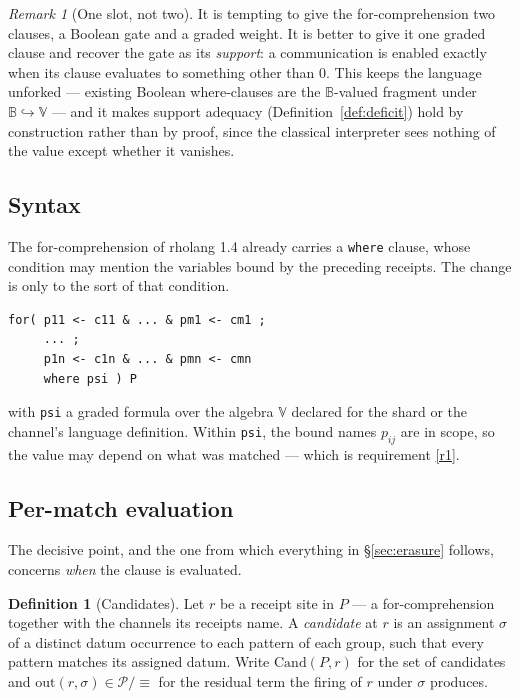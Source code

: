 \documentclass[11pt,a4paper]{article}
\theoremstyle{plain}
\theoremstyle{definition}
\newtheorem{definition}[theorem]{Definition}
\theoremstyle{remark}
\newtheorem{remark}[theorem]{Remark}
\newcommand{\V}{\mathbb{V}}
\newcommand{\Bool}{\mathbb{B}}
\newcommand{\Proc}{\mathcal{P}}
\newcommand{\scong}{\equiv}
\newcommand{\Cand}{\mathrm{Cand}}
\newcommand{\Out}{\mathrm{out}}
\begin{document}
\begin{remark}[One slot, not two]\label{rem:oneslot}
It is tempting to give the for-comprehension two clauses, a Boolean gate and a
graded weight. It is better to give it one graded clause and recover the gate as
its \emph{support}: a communication is enabled exactly when its clause evaluates
to something other than $0$. This keeps the language unforked --- existing
Boolean where-clauses are the $\Bool$-valued fragment under
$\Bool \hookrightarrow \V$ --- and it makes support adequacy
(Definition~\ref{def:deficit}) hold by construction rather than by proof, since
the classical interpreter sees nothing of the value except whether it vanishes.
\end{remark}

\subsection{Syntax}

The for-comprehension of rholang 1.4 already carries a \texttt{where} clause,
whose condition may mention the variables bound by the preceding receipts. The
change is only to the sort of that condition.

\begin{lstlisting}
for( p11 <- c11 & ... & pm1 <- cm1 ;
     ... ;
     p1n <- c1n & ... & pmn <- cmn
     where psi ) P
\end{lstlisting}

\noindent
with \texttt{psi} a graded formula over the algebra $\V$ declared for the shard
or the channel's language definition. Within \texttt{psi}, the bound names
$p_{ij}$ are in scope, so the value may depend on what was matched --- which is
requirement \ref{r1}.

\subsection{Per-match evaluation}\label{ssec:permatch}

The decisive point, and the one from which everything in \S\ref{sec:erasure}
follows, concerns \emph{when} the clause is evaluated.

\begin{definition}[Candidates]\label{def:cand}
Let $r$ be a receipt site in $P$ --- a for-comprehension together with the
channels its receipts name. A \emph{candidate} at $r$ is an assignment $\sigma$
of a distinct datum occurrence to each pattern of each group, such that every
pattern matches its assigned datum. Write $\Cand(P,r)$ for the set of candidates
and $\Out(r,\sigma) \in \Proc/{\scong}$ for the residual term the firing of $r$
under $\sigma$ produces.
\end{definition}
\end{document}
